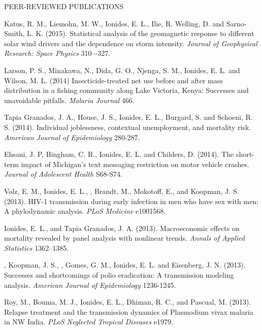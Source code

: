 \begin{reflist}{PEER-REVIEWED PUBLICATIONS}
\item
Katus, R. M., Liemohn,  M. W.,  Ionides, E. L., Ilie, R. Welling, D. and Sarno-Smith, L. K. (2015). Statistical analysis of the geomagnetic response to different solar wind drivers and the dependence on storm intensity. {\em Journal of Geophysical Research: Space Physics} {}{\separator}310–-327. 


\item
Larson, P. S., Minakawa,  N., Dida,  G. O., Njenga,  S. M., Ionides,  E. L. and Wilson,  M. L. (2014)
Insecticide-treated net use before and after mass distribution in a fishing community along Lake Victoria, Kenya: Successes and unavoidable pitfalls.
{\em Malaria Journal} {}{\separator}466. 

\item\formal{[[\tapiaPNAS] ]} 
Tapia Granados, J. A.,  House, J. S., Ionides, E. L., Burgard, S. and Schoeni, R. S. (2014). Individual joblessness, contextual unemployment, and mortality risk. {\em American Journal of Epidemiology}  {}{\separator}280-287.

\item\formal{[[\ehsani] ]} 
Ehsani, J. P, Bingham, C. R., Ionides, E. L. and Childers, D. (2014). The short-term impact of Michigan's text messaging restriction on motor vehicle crashes. {\it Journal of Adolescent Health}  {}{\separator}S68-S74.

\item\formal{[[\volz] ] }
Volz, E. M., Ionides, E. L., , Brandt, M., Mokotoff, E., and Koopman, J. S. (2013). HIV-1 transmission during early infection in men who have sex with men: A phylodynamic analysis.
{\em PLoS Medicine} {}{\separator}e1001568.

\item\formal{[[\ionidesAOAS] ] }
Ionides, E. L.,  and Tapia Granados, J. A. 
(2013). 
Macroeconomic effects on mortality revealed by panel analysis with nonlinear trends. {\em Annals of Applied Statistics} {}{\separator}1362–1385.

\item\formal{[[\mayerAJE] ] }
, Koopman, J. S., , Gomes, G. M., Ionides, E. L. and Eisenberg, J. N. (2013). Successes and shortcomings of polio eradication:  A transmission modeling analysis. {\em American Journal of Epidemiology} {}{\separator}1236-1245. 

\item\formal{[[\royPLOSNTD] ] }
Roy, M., Bouma, M. J., Ionides, E. L., Dhiman, R. C., and Pascual, M. 
(2013). Relapse treatment and the transmission dynamics of Plasmodium vivax malaria in NW India. {\em PLoS Neglected Tropical Diseases} {}{\separator}e1979.


\end{reflist}
